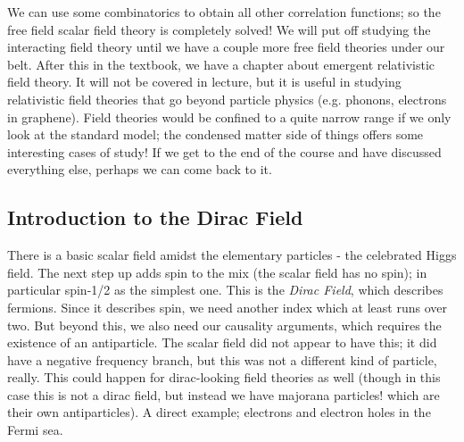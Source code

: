 We can use some combinatorics to obtain all other correlation functions; so the free field scalar field theory is completely solved! We will put off studying the interacting field theory until we have a couple more free field theories under our belt. After this in the textbook, we have a chapter about emergent relativistic field theory. It will not be covered in lecture, but it is useful in studying relativistic field theories that go beyond particle physics (e.g. phonons, electrons in graphene). Field theories would be confined to a quite narrow range if we only look at the standard model; the condensed matter side of things offers some interesting cases of study! If we get to the end of the course and have discussed everything else, perhaps we can come back to it.

\subsection{Introduction to the Dirac Field}
There is a basic scalar field amidst the elementary particles - the celebrated Higgs field. The next step up adds spin to the mix (the scalar field has no spin); in particular spin-1/2 as the simplest one. This is the \emph{Dirac Field}, which describes fermions. Since it describes spin, we need another index which at least runs over two. But beyond this, we also need our causality arguments, which requires the existence of an antiparticle. The scalar field did not appear to have this; it did have a negative frequency branch, but this was not a different kind of particle, really. This could happen for dirac-looking field theories as well (though in this case this is not a dirac field, but instead we have majorana particles! which are their own antiparticles). A direct example; electrons and electron holes in the Fermi sea.

